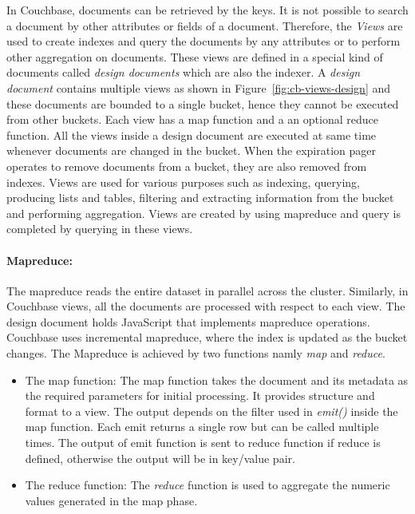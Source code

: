  In Couchbase, documents can be retrieved by the keys. It is not possible to search a document by other attributes or fields of a document.  Therefore, the \textit{Views} are used to create indexes and query the documents by any attributes or to perform other aggregation on documents. These views are defined in a special kind of documents called \textit{design documents} which are also the indexer. A \textit{design document} contains multiple views as shown in Figure~\ref{fig:cb-views-design} and these documents are bounded to a single bucket, hence they cannot be executed from other buckets. Each view has a map function and a an optional reduce function. All the views inside a design document are executed at same time whenever  documents are changed in the bucket. When the expiration pager operates to remove documents from a bucket, they are also removed from indexes. Views are used for various purposes such as indexing, querying, producing lists and tables, filtering and extracting information from the bucket and performing aggregation.  Views are created by using mapreduce and query is completed by querying in these views.
 
\paragraph{Mapreduce:} 
The mapreduce reads the entire dataset in parallel across the cluster. Similarly, in Couchbase views, all the documents are processed with respect to each view. The design document holds JavaScript that implements mapreduce operations. Couchbase uses incremental mapreduce, where the index is updated as the bucket changes. The Mapreduce is achieved by two functions namly \textit{map} and \textit{reduce}. 
\begin{itemize}
\item {The map function:}
The map function takes the document and its metadata as the required parameters for initial processing. It provides structure and format to a view. The output depends on the filter used in \textit{emit()} inside  the map function. Each emit returns a single row but can be called multiple times. The output of emit function is sent to reduce function if reduce is defined, otherwise the output will be in key/value pair. 

\item {The reduce function:}
The \textit{reduce} function is used to aggregate the numeric values generated in the map phase.
\end{itemize}

